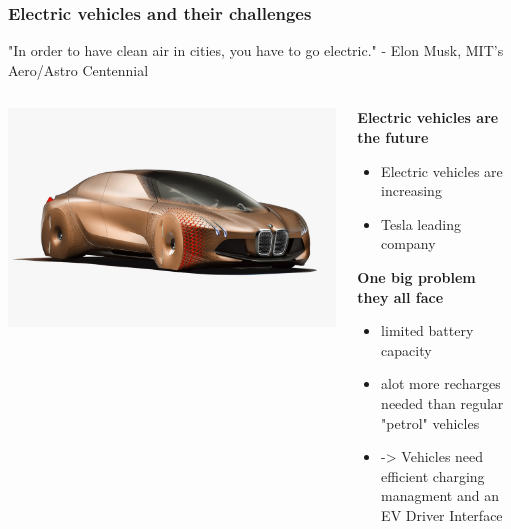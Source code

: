\begin{frame}
\frametitle{Electric vehicles and their challenges}
\begin{PraesentationAufzaehlung}
		
		"In order to have clean air in cities, you have to go electric." - Elon Musk, MIT's Aero/Astro Centennial
		
	\begin{columns}
		\begin{column}{0.4\textwidth}
			\begin{center}
				\includegraphics[scale=0.75]{images/bmw1.png}
			\end{center}
		\end{column}
		\begin{column}{0.6\textwidth}
			\item \textbf{Electric vehicles are the future}
			\begin{itemize}
				\item	Electric vehicles are increasing
				\item 	Tesla leading company
			\end{itemize}	
			
			\vspace{-8mm}
			
			\item \textbf{One big problem they all face}
			\begin{itemize}
				\item limited battery capacity
				\item alot more recharges needed than regular "petrol" vehicles
				\item -> Vehicles need efficient charging managment and an EV Driver Interface
			\end{itemize}
		\end{column}
	\end{columns}
\end{PraesentationAufzaehlung}
	\vspace{-2mm}
	
	
\end{frame}
\clearpage


